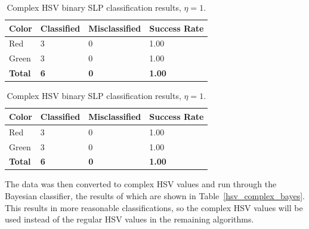 \documentclass[twoside]{IEEEtran}
\begin{document}
\begin{table}[!b]
    \centering

    \begin{minipage}{\columnwidth}
        \centering
        \caption{RGB binary SLP classification results, \( \eta = 1 \).}%
        \label{rgb_binary_slp}
        \begin{tabular}{ l l l l }
            \toprule
            \bfseries Color & \bfseries Classified & \bfseries Misclassified & \bfseries Success Rate \\
            \midrule
            Red             & 3                    & 0                       & 1.00                   \\
            Green           & 3                    & 0                       & 1.00                   \\
            \midrule
            \bfseries Total & \bfseries 6          & \bfseries 0             & \bfseries 1.00         \\
            \bottomrule
        \end{tabular}
    \end{minipage}%
    \begin{minipage}{\columnwidth}
        \centering
        \caption{Complex HSV binary SLP classification results, \( \eta = 1 \).}%
        \label{hsv_binary_slp}
        \begin{tabular}{ l l l l }
            \toprule
            \bfseries Color & \bfseries Classified & \bfseries Misclassified & \bfseries Success Rate \\
            \midrule
            Red             & 3                    & 0                       & 1.00                   \\
            Green           & 3                    & 0                       & 1.00                   \\
            \midrule
            \bfseries Total & \bfseries 6          & \bfseries 0             & \bfseries 1.00         \\
            \bottomrule
        \end{tabular}
    \end{minipage}
\end{table}

The data was then converted to complex HSV values and run through the Bayesian classifier, the
results of which are shown in Table~\ref{hsv_complex_bayes}. This results in more reasonable classifications, so the
complex HSV values will be used instead of the regular HSV values in the remaining algorithms.
\end{document}
